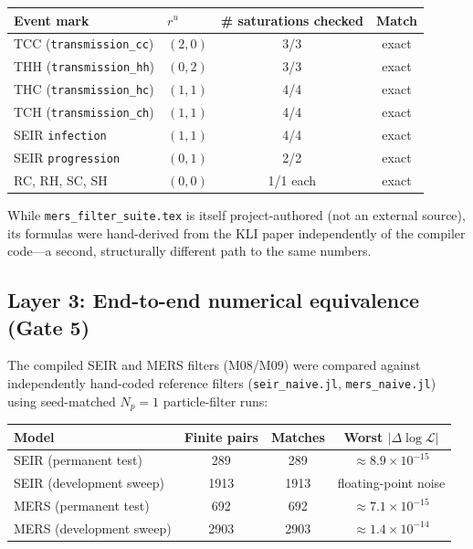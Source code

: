 \documentclass[11pt,leqno]{article}
\newcommand{\lik}{\mathcal{L}}      %
\newcommand{\code}[1]{\texttt{#1}}
\theoremstyle{plain}
\theoremstyle{definition}
\begin{document}
\begin{center}
\renewcommand{\arraystretch}{1.15}
\begin{tabular}{llcc}
\toprule
\textbf{Event mark} & \textbf{$r^u$} &
  \textbf{\# saturations checked} & \textbf{Match} \\
\midrule
TCC (\code{transmission\_cc}) & $(2,0)$ & 3/3 & exact \\
THH (\code{transmission\_hh}) & $(0,2)$ & 3/3 & exact \\
THC (\code{transmission\_hc}) & $(1,1)$ & 4/4 & exact \\
TCH (\code{transmission\_ch}) & $(1,1)$ & 4/4 & exact \\
SEIR \code{infection}         & $(1,1)$ & 4/4 & exact \\
SEIR \code{progression}       & $(0,1)$ & 2/2 & exact \\
RC, RH, SC, SH                & $(0,0)$ & 1/1 each & exact \\
\bottomrule
\end{tabular}
\end{center}

While \code{mers\_filter\_suite.tex} is itself project-authored (not
an external source), its formulas were hand-derived from the KLI paper
independently of the compiler code---a second, structurally different
path to the same numbers.

\subsection{Layer 3: End-to-end numerical equivalence (Gate 5)}

The compiled SEIR and MERS filters (M08/M09) were compared against
independently hand-coded reference filters (\code{seir\_naive.jl},
\code{mers\_naive.jl}) using seed-matched $N_p = 1$ particle-filter
runs:

\begin{center}
\renewcommand{\arraystretch}{1.15}
\begin{tabular}{lccc}
\toprule
\textbf{Model} & \textbf{Finite pairs} &
  \textbf{Matches} & \textbf{Worst $|\Delta\log\lik|$} \\
\midrule
SEIR (permanent test) & 289 & 289 & $\approx 8.9 \times 10^{-15}$ \\
SEIR (development sweep) & 1913 & 1913 & floating-point noise \\
MERS (permanent test) & 692 & 692 & $\approx 7.1 \times 10^{-15}$ \\
MERS (development sweep) & 2903 & 2903 & $\approx 1.4 \times 10^{-14}$ \\
\bottomrule
\end{tabular}
\end{center}
\end{document}
